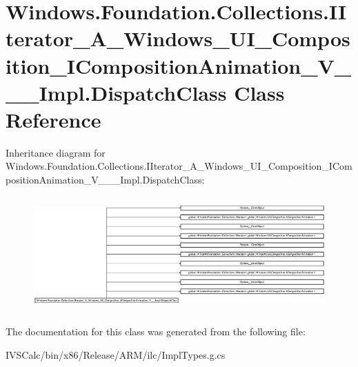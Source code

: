 \hypertarget{class_windows_1_1_foundation_1_1_collections_1_1_i_iterator___a___windows___u_i___composition___6dfa8a3651add949a5c031fd486f0ebe}{}\section{Windows.\+Foundation.\+Collections.\+I\+Iterator\+\_\+\+A\+\_\+\+Windows\+\_\+\+U\+I\+\_\+\+Composition\+\_\+\+I\+Composition\+Animation\+\_\+\+V\+\_\+\+\_\+\+\_\+\+Impl.\+Dispatch\+Class Class Reference}
\label{class_windows_1_1_foundation_1_1_collections_1_1_i_iterator___a___windows___u_i___composition___6dfa8a3651add949a5c031fd486f0ebe}
Inheritance diagram for Windows.\+Foundation.\+Collections.\+I\+Iterator\+\_\+\+A\+\_\+\+Windows\+\_\+\+U\+I\+\_\+\+Composition\+\_\+\+I\+Composition\+Animation\+\_\+\+V\+\_\+\+\_\+\+\_\+\+Impl.\+Dispatch\+Class\+:\begin{figure}[H]
\begin{center}
\leavevmode
\includegraphics[height=4.450867cm]{class_windows_1_1_foundation_1_1_collections_1_1_i_iterator___a___windows___u_i___composition___6dfa8a3651add949a5c031fd486f0ebe}
\end{center}
\end{figure}


The documentation for this class was generated from the following file\+:\begin{DoxyCompactItemize}
\item 
I\+V\+S\+Calc/bin/x86/\+Release/\+A\+R\+M/ilc/Impl\+Types.\+g.\+cs\end{DoxyCompactItemize}

